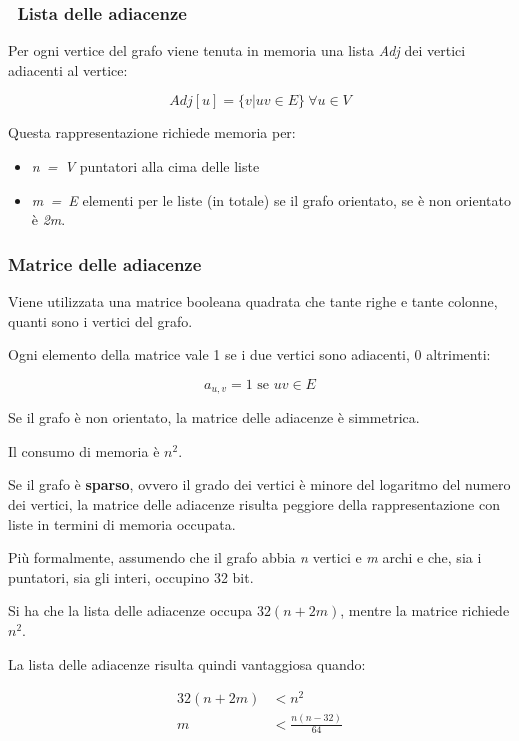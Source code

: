 \subsubsection{~Lista delle adiacenze}\label{lista-delle-adiacenze}

Per ogni vertice del grafo viene tenuta in memoria una lista \textit{Adj} dei vertici
adiacenti al vertice:

$$
Adj[u] = \{v | uv \in E\} \: \forall u \in V 
$$

Questa rappresentazione richiede memoria per:

\begin{itemize}
\tightlist
\item
  \textit{n\ =\ \textbar{}V\textbar{}} puntatori alla cima delle liste
\item
  \textit{m\ =\ \textbar{}E\textbar{}} elementi per le liste (in totale)
  se il grafo orientato, se è non orientato è \textit{2m}.
\end{itemize}

\subsubsection{Matrice delle adiacenze}\label{matrice-delle-adiacenze}

Viene utilizzata una matrice booleana quadrata che tante righe e tante
colonne, quanti sono i vertici del grafo.

Ogni elemento della matrice vale 1 se i due vertici sono adiacenti, 0
altrimenti:

$$
a_{u,v} = 1 \text{ se } uv \in E
$$

Se il grafo è non orientato, la matrice delle adiacenze è simmetrica.

Il consumo di memoria è $n^2$.

Se il grafo è \textbf{sparso}, ovvero il grado dei vertici è minore del
logaritmo del numero dei vertici, la matrice delle adiacenze risulta
peggiore della rappresentazione con liste in termini di memoria
occupata.

Più formalmente, assumendo che il grafo abbia \textit{n} vertici e \textit{m} archi e che, sia i puntatori, sia gli interi, occupino 32 bit.

Si ha che la lista delle adiacenze occupa $32(n+2m)$, mentre la matrice richiede $n^2$.

La lista delle adiacenze risulta quindi vantaggiosa quando:

\begin{align*}
	32(n+2m) &< n^2 \\
	m &< \frac{n(n-32)}{64}
\end{align*}


